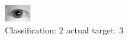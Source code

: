 \begin{figure}[h!]
\begin{center}
\includegraphics[width=0.60\columnwidth]{figures/ID1150_class_2_target_3.png}
\end{center}
\caption{ Classification: 2 actual target: 3}
\label{fig:ID1150_class_2_target_3}
\end{figure}
